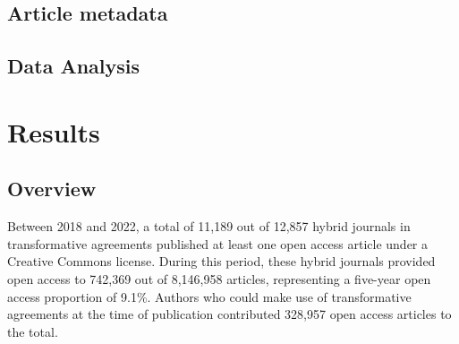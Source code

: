 \documentclass[a4paper,man,floatsintext,longtable,noextraspace,12pt]{apa6}
\begin{document}
\hypertarget{article-metadata}{%
\subsection{Article metadata}\label{article-metadata}}

\hypertarget{data-analysis}{%
\subsection{Data Analysis}\label{data-analysis}}

\hypertarget{results}{%
\section{Results}\label{results}}

\hypertarget{overview}{%
\subsection{Overview}\label{overview}}

Between 2018 and 2022, a total of 11,189 out of 12,857 hybrid journals
in transformative agreements published at least one open access article
under a Creative Commons license. During this period, these hybrid
journals provided open access to 742,369 out of 8,146,958 articles,
representing a five-year open access proportion of 9.1\%. Authors who
could make use of transformative agreements at the time of publication
contributed 328,957 open access articles to the total.
\end{document}
